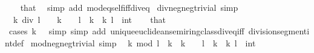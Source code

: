 \begin{isabellebody}
%
\isadelimproof
\ \ %
\endisadelimproof
%
\isatagproof
{}\isamarkupfalse%
\ that\ \isamarkupfalse%
\ {\isacharparenleft}{\kern0pt}simp\ add{\isacharcolon}{\kern0pt}\ mod{\isacharunderscore}{\kern0pt}eq{\isacharunderscore}{\kern0pt}self{\isacharunderscore}{\kern0pt}iff{\isacharunderscore}{\kern0pt}div{\isacharunderscore}{\kern0pt}eq{\isacharunderscore}{\kern0pt}{}{\isacharparenright}{\kern0pt}%
\endisatagproof
{\isafoldproof}%
%
\isadelimproof
\isanewline
%
\endisadelimproof
\isanewline
{}\isamarkupfalse%
\ div{\isacharunderscore}{\kern0pt}neg{\isacharunderscore}{\kern0pt}neg{\isacharunderscore}{\kern0pt}trivial\ {\isacharbrackleft}{\kern0pt}simp{\isacharbrackright}{\kern0pt}{\isacharcolon}{\kern0pt}\isanewline
\ \ {\isachardoublequoteopen}k\ div\ l\ {\isacharequal}{\kern0pt}\ {}{\isachardoublequoteclose}\ \ {\isachardoublequoteopen}k\ {\isasymle}\ {}{\isachardoublequoteclose}\ \ {\isachardoublequoteopen}l\ {\isacharless}{\kern0pt}\ k{\isachardoublequoteclose}\ \ k\ l\ {\isacharcolon}{\kern0pt}{\isacharcolon}{\kern0pt}\ int\isanewline
%
\isadelimproof
\ \ %
\endisadelimproof
%
\isatagproof
{}\isamarkupfalse%
\ that\ \isamarkupfalse%
\ {\isacharparenleft}{\kern0pt}cases\ {\isachardoublequoteopen}k\ {\isacharequal}{\kern0pt}\ {}{\isachardoublequoteclose}{\isacharparenright}{\kern0pt}\ {\isacharparenleft}{\kern0pt}simp{\isacharcomma}{\kern0pt}\ simp\ add{\isacharcolon}{\kern0pt}\ unique{\isacharunderscore}{\kern0pt}euclidean{\isacharunderscore}{\kern0pt}semiring{\isacharunderscore}{\kern0pt}class{\isachardot}{\kern0pt}div{\isacharunderscore}{\kern0pt}eq{\isacharunderscore}{\kern0pt}{}{\isacharunderscore}{\kern0pt}iff\ division{\isacharunderscore}{\kern0pt}segment{\isacharunderscore}{\kern0pt}int{\isacharunderscore}{\kern0pt}def{\isacharparenright}{\kern0pt}%
\endisatagproof
{\isafoldproof}%
%
\isadelimproof
\isanewline
%
\endisadelimproof
\isanewline
{}\isamarkupfalse%
\ mod{\isacharunderscore}{\kern0pt}neg{\isacharunderscore}{\kern0pt}neg{\isacharunderscore}{\kern0pt}trivial\ {\isacharbrackleft}{\kern0pt}simp{\isacharbrackright}{\kern0pt}{\isacharcolon}{\kern0pt}\isanewline
\ \ {\isachardoublequoteopen}k\ mod\ l\ {\isacharequal}{\kern0pt}\ k{\isachardoublequoteclose}\ \ {\isachardoublequoteopen}k\ {\isasymle}\ {}{\isachardoublequoteclose}\ \ {\isachardoublequoteopen}l\ {\isacharless}{\kern0pt}\ k{\isachardoublequoteclose}\ \ k\ l\ {\isacharcolon}{\kern0pt}{\isacharcolon}{\kern0pt}\ int\isanewline

\end{isabellebody}
